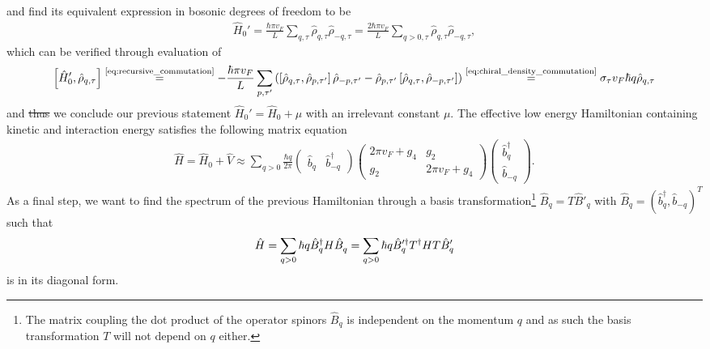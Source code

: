 \documentclass{svmono}
\def\pdag{{\vphantom\dag}}
\newcommand{\commutator}[1]{\left[ #1 \right]}
\newcommand{\brlr}[1]{\left( #1 \right)}
\providecommand{\DIFdeltex}[1]{{\protect\color{red}\sout{#1}}}                      %
\providecommand{\DIFdelbegin}{} %
\providecommand{\DIFdelend}{} %
\providecommand{\DIFdel}[1]{\texorpdfstring{\DIFdeltex{#1}}{}} %
\newcommand{\DIFscaledelfig}{0.5}
\newlength{\DIFdelgraphicswidth} %
\newlength{\DIFdelgraphicsheight} %
\newcommand{\DIFdelincludegraphics}[2][]{%
\sbox{\DIFdelgraphicsbox}{\DIFOincludegraphics[#1]{#2}}%
\settoboxwidth{\DIFdelgraphicswidth}{\DIFdelgraphicsbox} %
\settoboxtotalheight{\DIFdelgraphicsheight}{\DIFdelgraphicsbox} %
\scalebox{\DIFscaledelfig}{%
\parbox[b]{\DIFdelgraphicswidth}{\usebox{\DIFdelgraphicsbox}\\[-\baselineskip] \rule{\DIFdelgraphicswidth}{0em}}\llap{\resizebox{\DIFdelgraphicswidth}{\DIFdelgraphicsheight}{%
\setlength{\unitlength}{\DIFdelgraphicswidth}%
\begin{picture}(1,1)%
\thicklines\linethickness{2pt} %
{\color[rgb]{1,0,0}\put(0,0){\framebox(1,1){}}}%
{\color[rgb]{1,0,0}\put(0,0){\line( 1,1){1}}}%
{\color[rgb]{1,0,0}\put(0,1){\line(1,-1){1}}}%
\end{picture}%
}\hspace*{3pt}}} %
} %
\DeclareRobustCommand{\DIFdelbegin}{\DIFOdelbegin \let\includegraphics\DIFdelincludegraphics} %
\DeclareRobustCommand{\DIFdelend}{\DIFOaddend \let\includegraphics\DIFOincludegraphics} %
\begin{document}
and find its equivalent expression in bosonic degrees of freedom to be
\begin{align}
    \hat H_0' = \frac{\hbar \pi v_F}L\sum_{q,\tau}\hat\rho_{q,\tau}\hat\rho_{-q,\tau} = \frac{2\hbar\pi v_F}L\sum_{q>0,\tau}\hat\rho_{q,\tau}\hat\rho_{-q,\tau},
\end{align}
which can be verified through evaluation of
\begin{align}
    \commutator{\hat H_0',\hat\rho_{q,\tau}}
    \overset{\text{\cref{eq:recursive_commutation}}}{=}
    -\frac{\hbar \pi v_F}L
    \sum_{p,\tau'}
    \brlr{
    \commutator{\hat\rho_{q,\tau},\hat\rho_{p,\tau'}}\hat\rho_{-p,\tau'}
    -
    \hat\rho_{p,\tau'}\commutator{\hat\rho_{q,\tau},\hat\rho_{-p,\tau'}}
    }
    \overset{\text{\cref{eq:chiral_density_commutation}}}{=}
    \sigma_\tau v_F \hbar q\hat\rho_{q,\tau}
\end{align}
and \DIFdelbegin \DIFdel{thus }\DIFdelend we conclude our previous statement $\hat H_0' = \hat H_0 + \mu$ with an irrelevant constant $\mu$.
The effective low energy Hamiltonian containing kinetic and interaction energy satisfies the following matrix equation
\begin{align}
    \hat H = \hat H_0 + \hat V \approx
    \sum_{q>0}\frac{\hbar q}{2\pi}
    \begin{pmatrix}
        \hat b_q & \hat b^\dag_{-q}
    \end{pmatrix}
    \begin{pmatrix}
        2\pi v_F + g_4 & g_2 \\
        g_2 & 2\pi v_F + g_4
    \end{pmatrix}
    \begin{pmatrix}
        \hat b^\dag_q \\ \hat b_{-q}
    \end{pmatrix}
    .
    \label{eq:luttinger_hamiltonian_nondiagonal}
\end{align}
As a final step, we want to find the spectrum of the previous Hamiltonian through a basis transformation\footnote{The matrix coupling the dot product of the operator spinors $\hat B_q$ is independent on the momentum $q$ and as such the basis transformation $T$ will not depend on $q$ either.} $\hat B_q = T \hat B'_q$ with $\hat B_q = (\hat b_q^\dag, \hat b_{-q})^T$ such that
\begin{align}
    \hat H = \sum_{q>0}\hbar q\hat B^\dag_q H \hat B^\pdag_q = \sum_{q>0}\hbar q\hat B'^\dag_q T^\dag H T \hat B'^\pdag_q
\end{align}
is in its diagonal form.
\end{document}
